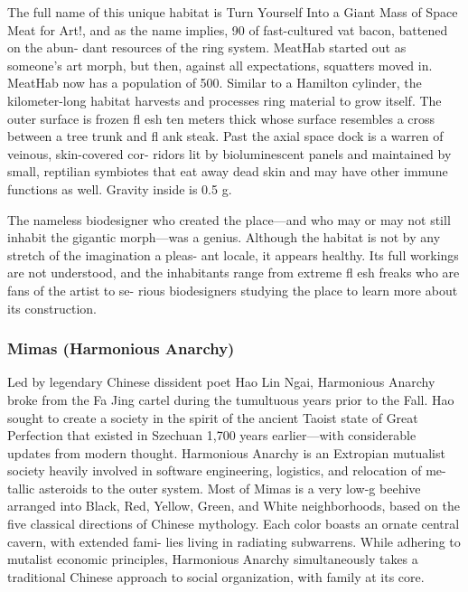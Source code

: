 The full name of this unique habitat is Turn Yourself 
Into a Giant Mass of Space Meat for Art!, and as the 
name implies, 90%
of fast-cultured vat bacon, battened on the abun-
dant resources of the ring system. MeatHab started 
out as someone's art morph, but then, against all 
expectations, squatters moved in. MeatHab now has 
a population of 500. Similar to a Hamilton cylinder, 
the kilometer-long habitat harvests and processes ring 
material to grow itself. The outer surface is frozen 
fl esh ten meters thick whose surface resembles a cross 
between a tree trunk and fl ank steak. Past the axial 
space dock is a warren of veinous, skin-covered cor-
ridors lit by bioluminescent panels and maintained by 
small, reptilian symbiotes that eat away dead skin and 
may have other immune functions as well. Gravity 
inside is 0.5 g.

The nameless biodesigner who created the 
place—and who may or may not still inhabit the 
gigantic morph—was a genius. Although the habitat 
is not by any stretch of the imagination a pleas-
ant locale, it appears healthy. Its full workings are 
not understood, and the inhabitants range from 
extreme fl esh freaks who are fans of the artist to se-
rious biodesigners studying the place to learn more 
about its construction.

\subsubsection{Mimas (Harmonious Anarchy)}

Led by legendary Chinese dissident poet Hao Lin 
Ngai, Harmonious Anarchy broke from the Fa Jing 
cartel during the tumultuous years prior to the Fall. 
Hao sought to create a society in the spirit of the 
ancient Taoist state of Great Perfection that existed 
in Szechuan 1,700 years earlier—with considerable 
updates from modern thought. Harmonious Anarchy 
is an Extropian mutualist society heavily involved in 
software engineering, logistics, and relocation of me-
tallic asteroids to the outer system. Most of Mimas is 
a very low-g beehive arranged into Black, Red, Yellow, 
Green, and White neighborhoods, based on the five 
classical directions of Chinese mythology. Each color 
boasts an ornate central cavern, with extended fami-
lies living in radiating subwarrens. While adhering to 
mutalist economic principles, Harmonious Anarchy 
simultaneously takes a traditional Chinese approach 
to social organization, with family at its core.


